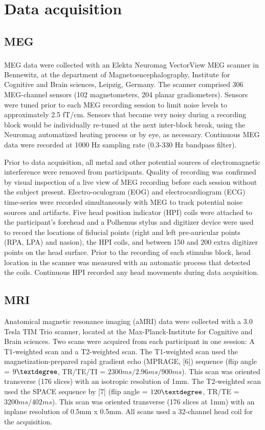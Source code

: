 \section{Data acquisition}

\subsection {MEG}
MEG data were collected with an Elekta Neuromag VectorView\textsuperscript{\textregistered} MEG scanner in Bennewitz, at the department of Magnetoencephalography, Institute for Cognitive and Brain sciences, Leipzig, Germany.
The scanner comprised 306 MEG-channel sensors (102 magnetometers, 204 planar gradiometers).
Sensors were tuned prior to each MEG recording session to limit noise levels to approximately 2.5 fT/cm.
Sensors that became very noisy during a recording block would be individually re-tuned at the next inter-block break, using the Neuromag automatized heating process or by eye, as necessary.
Continuous MEG data were recorded at 1000 Hz sampling rate (0.3-330 Hz bandpass filter).

Prior to data acquisition, all metal and other potential sources of electromagnetic interference were removed from participants.
Quality of recording was confirmed by visual inspection of a live view of MEG recording before each session without the subject present.
Electro-oculogram (EOG) and electrocardiogram (ECG) time-series were recorded simultaneously with MEG to track potential noise sources and artifacts.
Five head position indicator (HPI) coils were attached to the participant's forehead and a Polhemus stylus and digitizer device were used to record the locations of fiducial points (right and left pre-auricular points (RPA, LPA) and nasion), the HPI coils, and between 150 and 200 extra digitizer points on the head surface.
Prior to the recording of each stimulus block, head location in the scanner was measured with an automatic process that detected the coils.
Continuous HPI recorded any head movements during data acquisition.

\subsection {MRI}
Anatomical magnetic resonance imaging (aMRI) data were collected with a 3.0 Tesla TIM Trio scanner, located at the Max-Planck-Institute for Cognitive and Brain sciences.
Two scans were acquired from each participant in one session: A T1-weighted scan and a T2-weighted scan.
The T1-weighted scan used the magnetization-prepared rapid gradient echo (MPRAGE, [6]) sequence (flip angle = $9\textdegree$, TR/TE/TI = $2300ms/2.96ms/900ms$).
This scan was oriented transverse (176 slices) with an isotropic resolution of 1mm.
The T2-weighted scan used the SPACE sequence by [7] (flip angle = $120\textdegree$, TR/TE = $3200ms/402ms$).
This scan was oriented transverse (176 slices at 1mm) with an inplane resolution of 0.5mm x 0.5mm.
All scans used a 32-channel head coil for the acquisition.



